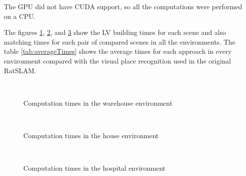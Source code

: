 The GPU did not have CUDA support, so all the computations were performed on a CPU.\par
The figures \ref{fig:timesWarehouse}, \ref{fig:timesHouse}, and \ref{fig:timesHospital} show the LV building times for each scene and also matching times for each pair of compared scenes in all the environments. The table \ref{tab:averageTimes} shows the average times for each approach in every environment compared with the visual place recognition used in the original RatSLAM.


\begin{figure}[!tbp]
    \centering
    \\
    \caption{Computation times in the warehouse environment}
    \label{fig:timesWarehouse}
\end{figure}

\begin{figure}[!tbp]
    \centering
    \\
    \caption{Computation times in the house environment}
    \label{fig:timesHouse}
\end{figure}

\begin{figure}[!tbp]
    \centering
    \\
    \caption{Computation times in the hospital environment}
    \label{fig:timesHospital}
\end{figure}

